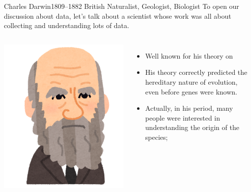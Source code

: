 \begin{frame}{Charles Darwin}{1809--1882 British Naturalist, Geologist, Biologist}
  To open our discussion about data, let's talk about a scientist whose work was all about collecting and understanding lots of data.
  \bigskip

  \begin{columns}
    \includegraphics[width=1\textwidth]{../img/irasutoya_darwin}
    \begin{itemize}
      \item Well known for his theory on 
      \item His theory correctly predicted the hereditary nature of evolution, even before genes were known.
      \item Actually, in his period, many people were interested in understanding the origin of the species;
    \end{itemize}
  \end{columns}
\end{frame}

